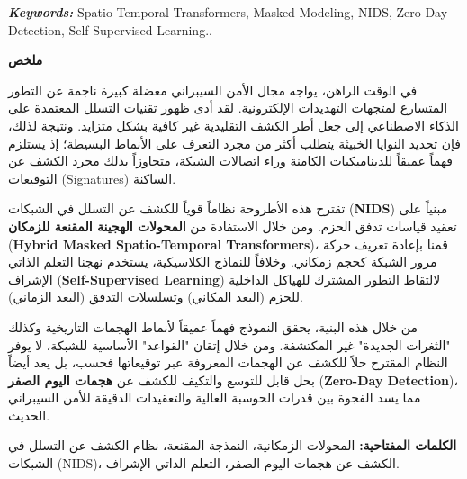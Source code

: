 \documentclass[12pt, a4paper]{report}
\begin{document}
\vspace{1cm}
\textbf{\textit{Keywords:}} Spatio-Temporal Transformers, Masked Modeling, NIDS, Zero-Day Detection, Self-Supervised Learning..



\clearpage
{}
\begin{Arabic}
{\centering\Huge\bfseries ملخص \par}

\vspace{1cm}

في الوقت الراهن، يواجه مجال الأمن السيبراني معضلة كبيرة ناجمة عن التطور المتسارع لمتجهات التهديدات الإلكترونية. لقد أدى ظهور تقنيات التسلل المعتمدة على الذكاء الاصطناعي إلى جعل أطر الكشف التقليدية غير كافية بشكل متزايد. ونتيجة لذلك، فإن تحديد النوايا الخبيثة يتطلب أكثر من مجرد التعرف على الأنماط البسيطة؛ إذ يستلزم فهماً عميقاً للديناميكيات الكامنة وراء اتصالات الشبكة، متجاوزاً بذلك مجرد الكشف عن التوقيعات (Signatures) الساكنة.

تقترح هذه الأطروحة نظاماً قوياً للكشف عن التسلل في الشبكات (\textbf{NIDS}) مبنياً على تعقيد قياسات تدفق الحزم. ومن خلال الاستفادة من \textbf{المحولات الهجينة المقنعة للزمكان} (\textbf{Hybrid Masked Spatio-Temporal Transformers})، قمنا بإعادة تعريف حركة مرور الشبكة كحجم زمكاني. وخلافاً للنماذج الكلاسيكية، يستخدم نهجنا التعلم الذاتي الإشراف (\textbf{Self-Supervised Learning}) لالتقاط التطور المشترك للهياكل الداخلية للحزم (البعد المكاني) وتسلسلات التدفق (البعد الزماني).

من خلال هذه البنية، يحقق النموذج فهماً عميقاً لأنماط الهجمات التاريخية وكذلك "الثغرات الجديدة" غير المكتشفة. ومن خلال إتقان "القواعد" الأساسية للشبكة، لا يوفر النظام المقترح حلاً للكشف عن الهجمات المعروفة عبر توقيعاتها فحسب، بل يعد أيضاً بحل قابل للتوسع والتكيف للكشف عن \textbf{هجمات اليوم الصفر} (\textbf{Zero-Day Detection})، مما يسد الفجوة بين قدرات الحوسبة العالية والتعقيدات الدقيقة للأمن السيبراني الحديث.

\vspace{1cm}

\textbf{الكلمات المفتاحية:} المحولات الزمكانية، النمذجة المقنعة، نظام الكشف عن التسلل في الشبكات (NIDS)، الكشف عن هجمات اليوم الصفر، التعلم الذاتي الإشراف.
\end{Arabic}
\end{document}
